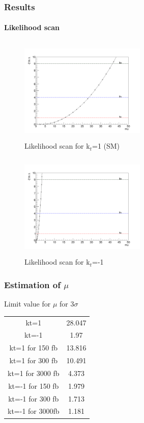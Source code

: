 \documentclass[11pt]{beamer}
\begin{document}
\begin{frame}
\frametitle{Results}
\framesubtitle{Likelihood scan}
\begin{minipage}{0.5\textwidth}
	\begin{center}
		\begin{figure}
			\includegraphics[width=6cm,height=5cm]{figures/Likelihood.png}
			\caption*{Likelihood scan for k$_t$=1 (SM)}
		\end{figure}
	\end{center}
\end{minipage}\hfill
\begin{minipage}{0.5\textwidth}
	\begin{center}
		\begin{figure}
			\includegraphics[width=6cm,height=5cm]{figures/Likelihood-kt-1.png}
			\caption*{Likelihood scan for k$_t$=-1}
		\end{figure}
	\end{center}
\end{minipage}
\end{frame}

\begin{frame}
\frametitle{Estimation of $\mu$}
Limit value for $\mu$ for $3\sigma$ 
\begin{tabular}{|c|c|}
kt=1 &  28.047  \\
kt=-1 & 1.97 \\
kt=1 for 150 fb &13.816 \\
kt=1 for 300 fb & 10.491\\
kt=1 for 3000 fb &  4.373 \\
kt=-1 for 150 fb &1.979 \\
kt=-1 for 300 fb &1.713 \\
kt=-1 for 3000fb & 1.181
\end{tabular}
\end{frame}
\end{document}
